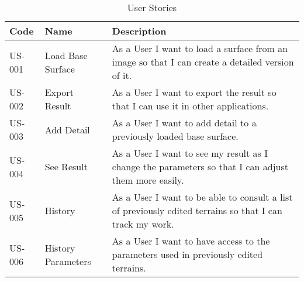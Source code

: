 \begin{table}[h!]
  \centering
  \renewcommand{\arraystretch}{1.5}
  \begin{tabularx}{\linewidth}{|l|l|b|}
	\hline
    \textbf{Code} & \textbf{Name} & \textbf{Description} \\ \hline
    US-001 & Load Base Surface & As a User I want to load a surface from an image so that I can create a detailed version of it. \\ \hline
    US-002 & Export Result & As a User I want to export the result so that I can use it in other applications. \\ \hline
    US-003 & Add Detail & As a User I want to add detail to a previously loaded base surface. \\ \hline
    US-004 & See Result & As a User I want to see my result as I change the parameters so that I can adjust them more easily. \\ \hline
    US-005 & History & As a User I want to be able to consult a list of previously edited terrains so that I can track my work. \\ \hline
    US-006 & History Parameters & As a User I want to have access to the parameters used in previously edited terrains. \\ \hline
    
  \end{tabularx}
  
  \caption{User Stories}
  \label{table:user_stories}
\end{table}